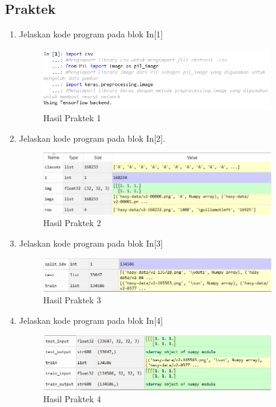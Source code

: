 



\subsection{Praktek}
\begin{enumerate}

\item Jelaskan kode program pada blok In[1]

\begin{figure}[H]
	\centering
	\includegraphics[width=10cm]{figures/1174084/7/1.png}
	\caption{Hasil Praktek 1}
\end{figure}

\item Jelaskan kode program pada blok In[2].

\begin{figure}[H]
	\centering
	\includegraphics[width=10cm]{figures/1174084/7/2.png}
	\caption{Hasil Praktek 2}
\end{figure}

\item Jelaskan kode program pada blok In[3]

\begin{figure}[H]
	\centering
	\includegraphics[width=10cm]{figures/1174084/7/3.png}
	\caption{Hasil Praktek 3}
\end{figure}

\item Jelaskan kode program pada blok  In[4]

\begin{figure}[H]
	\centering
	\includegraphics[width=10cm]{figures/1174084/7/4.png}
	\caption{Hasil Praktek 4}
\end{figure}


\end{enumerate}
